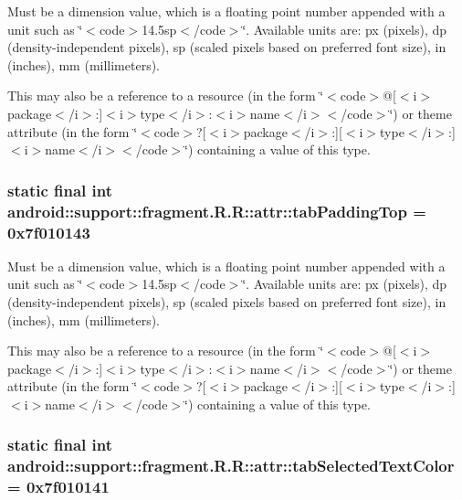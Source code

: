 Must be a dimension value, which is a floating point number appended with a unit such as \char`\"{}$<$code$>$14.5sp$<$/code$>$\char`\"{}. Available units are: px (pixels), dp (density-independent pixels), sp (scaled pixels based on preferred font size), in (inches), mm (millimeters). 

This may also be a reference to a resource (in the form \char`\"{}$<$code$>$@\mbox{[}$<$i$>$package$<$/i$>$:\mbox{]}$<$i$>$type$<$/i$>$:$<$i$>$name$<$/i$>$$<$/code$>$\char`\"{}) or theme attribute (in the form \char`\"{}$<$code$>$?\mbox{[}$<$i$>$package$<$/i$>$:\mbox{]}\mbox{[}$<$i$>$type$<$/i$>$:\mbox{]}$<$i$>$name$<$/i$>$$<$/code$>$\char`\"{}) containing a value of this type. \hypertarget{classandroid_1_1support_1_1fragment_1_1_r_1_1attr_43ade1dc36e5b96b61c3ec3600aa3ccc}{
\subsubsection[{tabPaddingTop}]{\setlength{\rightskip}{0pt plus 5cm}static final int android::support::fragment.R.R::attr::tabPaddingTop = 0x7f010143}}
\label{classandroid_1_1support_1_1fragment_1_1_r_1_1attr_43ade1dc36e5b96b61c3ec3600aa3ccc}


Must be a dimension value, which is a floating point number appended with a unit such as \char`\"{}$<$code$>$14.5sp$<$/code$>$\char`\"{}. Available units are: px (pixels), dp (density-independent pixels), sp (scaled pixels based on preferred font size), in (inches), mm (millimeters). 

This may also be a reference to a resource (in the form \char`\"{}$<$code$>$@\mbox{[}$<$i$>$package$<$/i$>$:\mbox{]}$<$i$>$type$<$/i$>$:$<$i$>$name$<$/i$>$$<$/code$>$\char`\"{}) or theme attribute (in the form \char`\"{}$<$code$>$?\mbox{[}$<$i$>$package$<$/i$>$:\mbox{]}\mbox{[}$<$i$>$type$<$/i$>$:\mbox{]}$<$i$>$name$<$/i$>$$<$/code$>$\char`\"{}) containing a value of this type. \hypertarget{classandroid_1_1support_1_1fragment_1_1_r_1_1attr_abd61d2aa6ae574f5f809a1d16043b56}{
\subsubsection[{tabSelectedTextColor}]{\setlength{\rightskip}{0pt plus 5cm}static final int android::support::fragment.R.R::attr::tabSelectedTextColor = 0x7f010141}}
\label{classandroid_1_1support_1_1fragment_1_1_r_1_1attr_abd61d2aa6ae574f5f809a1d16043b56}


